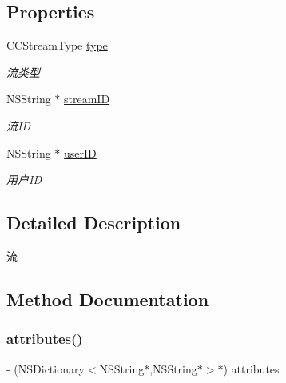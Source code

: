 \subsection*{Properties}
\begin{DoxyCompactItemize}
\item 
\mbox{\label{interface_c_c_stream_acff8eb23679975d6544646125770da22}} 
C\+C\+Stream\+Type \hyperlink{interface_c_c_stream_acff8eb23679975d6544646125770da22}{type}
\begin{DoxyCompactList}\small\item\em 流类型 \end{DoxyCompactList}\item 
\mbox{\label{interface_c_c_stream_aed87e9c0ddf3b9181233036e5313441e}} 
N\+S\+String $\ast$ \hyperlink{interface_c_c_stream_aed87e9c0ddf3b9181233036e5313441e}{stream\+ID}
\begin{DoxyCompactList}\small\item\em 流\+ID \end{DoxyCompactList}\item 
\mbox{\label{interface_c_c_stream_a580894607e83f70037c1088f53c70286}} 
N\+S\+String $\ast$ \hyperlink{interface_c_c_stream_a580894607e83f70037c1088f53c70286}{user\+ID}
\begin{DoxyCompactList}\small\item\em 用户\+ID \end{DoxyCompactList}\end{DoxyCompactItemize}


\subsection{Detailed Description}
流 

\subsection{Method Documentation}
\mbox{\label{interface_c_c_stream_a3688442340b99d3c28dcb1e0ed818de8}} 
\subsubsection{\texorpdfstring{attributes()}{attributes()}}
{\footnotesize\ttfamily -\/ (N\+S\+Dictionary$<$N\+S\+String$\ast$,N\+S\+String$\ast$$>$$\ast$) attributes \begin{DoxyParamCaption}{ }\end{DoxyParamCaption}}


